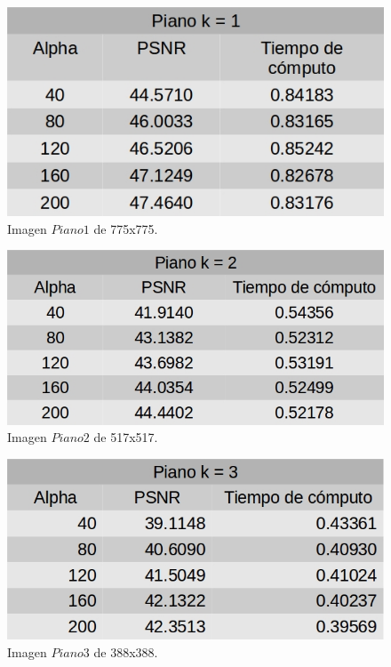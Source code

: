 \documentclass[a4paper]{article}
\begin{document}
        
    \begin{figure}[H]
    \centering
    \includegraphics[scale=0.4]{imagenes/piano1.jpg}
    \caption{Imagen $Piano1$ de 775x775.}
	\label{piano1}
    \end{figure}
    
    
    \begin{figure}[H]
    \centering
    \includegraphics[scale=0.4]{imagenes/piano2.jpg}
    \caption{Imagen $Piano2$ de 517x517.}
	\label{piano2}
    \end{figure}
    
     \begin{figure}[H]
    \centering
    \includegraphics[scale=0.4]{imagenes/piano3.jpg}
    \caption{Imagen $Piano3$ de 388x388.}
	\label{piano3}
    \end{figure}
    
\end{document}
